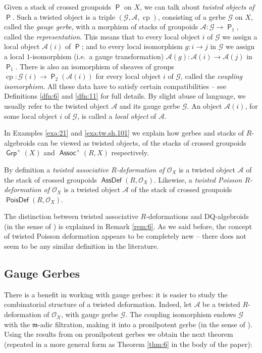 \documentclass[a4paper, 10pt]{amsart}
\theoremstyle{definition}
\numberwithin{equation}{section}
\newcommand{\opn}{\operatorname}
\newcommand{\cat}[1]{\operatorname{\mathsf{#1}}}
\newcommand{\mfrak}[1]{\mathfrak{#1}}
\newcommand{\mcal}[1]{\mathcal{#1}}
\newcommand{\bsym}[1]{\boldsymbol{#1}}
\newcommand{\m}{\mfrak{m}}
\newcommand{\gerbe}[1]{\bsym{\mcal{#1}}}
\newcommand{\twocat}[1]{\operatorname{\bsym{\cat{#1}}}}
\begin{document}
Given a stack of crossed groupoids $\twocat{P}$ on $X$, we can
talk about {\em twisted objects of $\twocat{P}$}. Such a twisted object 
is a triple $(\gerbe{G}, \gerbe{A}, \opn{cp})$, consisting
of a gerbe $\gerbe{G}$ on $X$, called the {\em gauge gerbe}, with a morphism of
stacks of groupoids $\gerbe{A} : \gerbe{G} \to \twocat{P}_1$,
called the {\em representation}. 
This means that to every local object $i$ of 
$\gerbe{G}$ we assign a local object $\gerbe{A}(i)$ of $\twocat{P}$; and to
every local isomorphism $g : i \to j$ in $\gerbe{G}$ we assign a local 
$1$-isomorphism (i.e.\ a gauge transformation) 
$\gerbe{A}(g) : \gerbe{A}(i) \to \gerbe{A}(j)$ in $\twocat{P}_1$.
There is also an isomorphism of sheaves of groups
$\opn{cp} : \gerbe{G}(i) \to \twocat{P}_2(\gerbe{A}(i))$
for every local object $i$ of $\gerbe{G}$, called the {\em coupling
isomorphism}. All these data have to satisfy certain compatibilities -- 
see Definitions \ref{dfn:6} and \ref{dfn:11} for full details.
By slight abuse of language, we usually refer to the
twisted object $\gerbe{A}$ and its gauge gerbe $\gerbe{G}$.
An object $\gerbe{A}(i)$, for some local object $i$ of $\gerbe{G}$, is called a
{\em local object} of $\gerbe{A}$. 

In Examples \ref{exa:21} and \ref{exa:tw.sh.101} we explain how gerbes and
stacks of $R$-algebroids can be viewed as twisted objects, of the stacks of
crossed groupoids $\twocat{Grp}^{\times}(X)$ and  
$\twocat{Assoc}^{\times}(R, X)$ respectively. 

By definition a {\em twisted associative $R$-deformation of $\mcal{O}_X$} is a 
twisted object $\gerbe{A}$ of the stack of crossed groupoids
$\twocat{AssDef}(R, \mcal{O}_X)$.
Likewise, a {\em twisted Poisson $R$-deformation of
$\mcal{O}_X$} is a twisted object $\gerbe{A}$ of the stack  of crossed groupoids
$\twocat{PoisDef}(R, \mcal{O}_X)$.

The distinction between twisted associative $R$-deformations and DQ-algebroids
(in the sense of \cite{KS2}) is explained in Remark \ref{rem:6}.
As we said before, the concept of twisted Poisson deformation appears to be
completely new -- there does not seem to be any similar definition in the
literature. 


\subsection{Gauge Gerbes}
There is a benefit in working with gauge gerbes: it is easier
to study the combinatorial structure of a twisted deformation.
Indeed, let $\gerbe{A}$ be a twisted $R$-deformation of $\mcal{O}_X$, with 
gauge gerbe $\gerbe{G}$. The coupling isomorphism endows $\gerbe{G}$
with the $\m$-adic filtration, making it into a pronilpotent
gerbe (in the sense of \cite{Ye4}). Using the results from 
\cite{Ye4} on pronilpotent gerbes we obtain the next theorem
(repeated in a more general form as Theorem \ref{thm:6} in the body of
the paper): 
\end{document}
